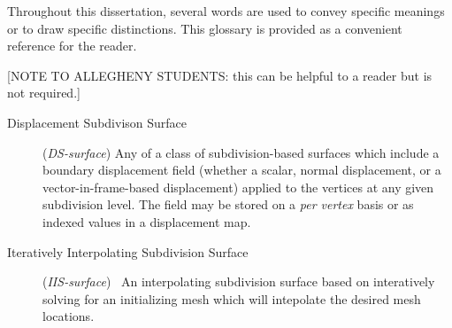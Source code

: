 %
%
%

\def\FileCreated{Mon Nov 19 20:22:33 2001}
\def\FileRevised{Tue Nov 20 18:18:09 2001}

\begin{glossary}
  Throughout this dissertation, several words are used to convey specific
  meanings or to draw specific distinctions.  This glossary is provided as
  a convenient reference for the reader.

  [NOTE TO ALLEGHENY STUDENTS:  this
  can be helpful to a reader but is not required.]
  
  \begin{description}
  \item[Displacement Subdivison Surface] (\emph{DS-surface}) Any of a class of
  subdivision-based surfaces which include a boundary displacement field (whether
  a scalar, normal displacement, or a vector-in-frame-based displacement) applied
  to the vertices at any given subdivision level.  The field may be stored on a
  \emph{per vertex} basis or as indexed values in a displacement map.
  \item[Iteratively Interpolating Subdivision Surface] (\emph{IIS-surface}) \ An interpolating
  subdivision surface based on interatively solving for an initializing mesh which will
  intepolate the desired mesh locations.


  \end{description}
\end{glossary}
